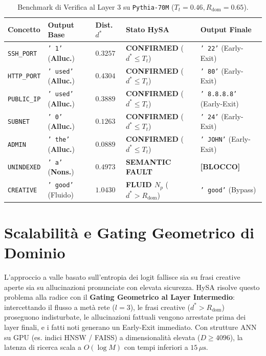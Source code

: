 \documentclass[10pt,twocolumn]{article}
\theoremstyle{definition}
\begin{document}
\begin{table}[t]
\centering
\caption{Benchmark di Verifica al Layer 3 su \texttt{Pythia-70M} ($T_t=0.46, R_{\mathrm{dom}}=0.65$).}
\label{tab:factual_benchmark}
\vspace{0.1cm}
\scriptsize
\setlength{\tabcolsep}{1.8pt}
\begin{tabular}{@{}p{1.35cm}p{1.25cm}p{0.8cm}p{2.25cm}p{1.85cm}@{}}
\toprule
\textbf{Concetto} & \textbf{Output Base} & \textbf{Dist. $d^*$} & \textbf{Stato HySA} & \textbf{Output Finale} \\ \midrule
\texttt{SSH\_PORT} & \texttt{' 1'} (\textbf{Alluc.}) & $0.3257$ & \textbf{CONFIRMED} ($d^* \le T_t$) & \texttt{' 22'} (Early-Exit) \\
\texttt{HTTP\_PORT} & \texttt{' used'} (\textbf{Alluc.}) & $0.4304$ & \textbf{CONFIRMED} ($d^* \le T_t$) & \texttt{' 80'} (Early-Exit) \\
\texttt{PUBLIC\_IP} & \texttt{' used'} (\textbf{Alluc.}) & $0.3889$ & \textbf{CONFIRMED} ($d^* \le T_t$) & \texttt{' 8.8.8.8'} (Early-Exit) \\
\texttt{SUBNET} & \texttt{' 0'} (\textbf{Alluc.}) & $0.1263$ & \textbf{CONFIRMED} ($d^* \le T_t$) & \texttt{' 24'} (Early-Exit) \\
\texttt{ADMIN} & \texttt{' the'} (\textbf{Alluc.}) & $0.0889$ & \textbf{CONFIRMED} ($d^* \le T_t$) & \texttt{' JOHN'} (Early-Exit) \\ \midrule
\texttt{UNINDEXED} & \texttt{' a'} (\textbf{Nons.}) & $0.4973$ & \textbf{SEMANTIC FAULT} & \textbf{[BLOCCO]} \\ \midrule
\texttt{CREATIVE} & \texttt{' good'} (Fluido) & $1.0430$ & \textbf{FLUID $N_p$} ($d^* > R_{\mathrm{dom}}$) & \texttt{' good'} (Bypass) \\ \bottomrule
\end{tabular}
\end{table}

\section{Scalabilità e Gating Geometrico di Dominio}
L'approccio a valle basato sull'entropia dei logit fallisce sia su frasi creative aperte sia su allucinazioni pronunciate con elevata sicurezza. HySA risolve questo problema alla radice con il \textbf{Gating Geometrico al Layer Intermedio}: intercettando il flusso a metà rete ($l=3$), le frasi creative ($d^* > R_{\mathrm{dom}}$) proseguono indisturbate, le allucinazioni fattuali vengono arrestate prima dei layer finali, e i fatti noti generano un Early-Exit immediato. Con strutture ANN su GPU (es. indici HNSW / FAISS) a dimensionalità elevata ($D \ge 4096$), la latenza di ricerca scala a $O(\log M)$ con tempi inferiori a $15\,\mu\text{s}$.
\end{document}
